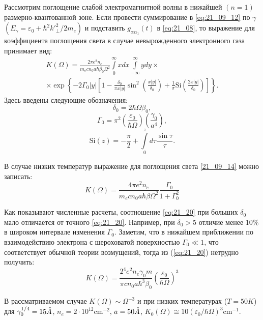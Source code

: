 Рассмотрим поглощение слабой электромагнитной волны в нижайшей $(n=1)$ размерно-квантованной зоне. Если провести суммирование в \eqref{eq:21_09_12} по $\gamma$ $\left( E_{\gamma} = \varepsilon_0 + \hbar^2 {k'}_{\bot}^2 / {2m_e} \right) $ и подставить $g_{\alpha\alpha_1 }(t)$ в \eqref{eq:21_08}, то выражение для коэффициента поглощения света в случае невырожденного электронного газа принимает вид:
\begin{multline} \label{21_09_14}
K(\Omega) = \frac{2 \pi e^2 n_e }{m_e c n_0 a \hbar \beta_0 \Omega^2} \int\limits_0^{\infty}x dx \int\limits_{-\infty}^{\infty}y dy \times \\
\times \exp{\left\lbrace  - 2\Gamma_0 |y| \left[ 1 - \frac{\delta_0}{\pi x |y|}\sin^2{\left( \frac{x|y|}{\delta_0}\right) } + \frac{1}{\pi} \mathrm{Si}{\left( \frac{2x|y|}{\delta_0}\right) } \right]  \right\rbrace   }.
\end{multline} 
Здесь введены следующие обозначения:
\[
\delta_0 = 2\hbar \Omega \beta_0,
\]
\[
\Gamma_0 = \pi^2 \left(\frac{\varepsilon_0}{\hbar \Omega} \right) \left( \frac{\gamma_0}{a^4} \right),
\]
\[
\mathrm{Si}(z) = -\frac{\pi}{2} + \int\limits_0^z{d\tau\frac{\sin{\tau}}{\tau}}.
\]

В случае низких температур выражение для поглощения света \eqref{21_09_14} можно записать:
\begin{equation} \label{eq:21_20}
K(\Omega )=\frac{4\pi e^{2} n_{e} }{m_e c n_0 a \hbar\beta \Omega^2 } \frac{\Gamma_0 }{1+\Gamma_0^2 }
\end{equation} 

Как показывают численные расчеты, соотношение \ref{eq:21_20} при больших $\delta_0$ мало отличается от точного \ref{eq:21_20}. Например, при $\delta_0 > 5$ отличие менее 10\% в широком интервале изменения $\Gamma_0$. Заметим, что в нижайшем приближении по взаимодействию электрона с шероховатой поверхностью $\Gamma_0 \ll 1$, что соответствует обычной теории возмущений, тогда из (\ref{eq:21_20}) нетрудно получить:
\begin{equation} \label{eq:21_30}
K(\Omega )=\frac{2^4 e^2 n_e \gamma_0 m}{\pi c n_0 a\hbar^3 \beta_0 } \left(\frac{\varepsilon_0 }{\hbar\Omega } \right)^3
\end{equation} 

В рассматриваемом случае $K(\Omega )\sim \Omega^{-3} $ и при низких температурах ($T=50 K$) для $\gamma_0^{1/4} =15 \AA$, $n_e = 2\cdot 10^{12} \text{cm}^{-2} $, $a=50 \AA$, $K_0 (\Omega )\cong 10\left(\varepsilon_0 / \hbar\Omega \right)^3 \text{cm}^{-1} $.

